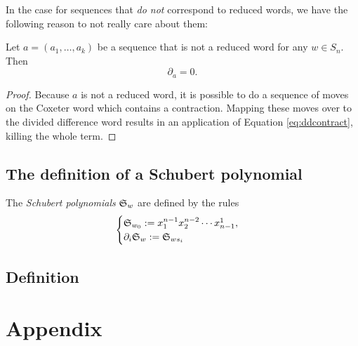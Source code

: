 \documentclass{article}
\newcommand{\frkS}{\ensuremath\mathfrak{S}}
\begin{document}
In the case for sequences that \textit{do not} correspond to reduced words, we have the following reason to not really care about them:
\begin{theorem}\label{thm:ddnonreducedzero}
    Let $a=(a_1,\ldots,a_k)$ be a sequence that is not a reduced word for any $w \in S_n$. Then
    \[
        \partial_a = 0.
    \]
\end{theorem}

\begin{proof}
    Because $a$ is not a reduced word, it is possible to do a sequence of moves on the Coxeter word which contains a contraction.
    Mapping these moves over to the divided difference word results in an application of Equation \ref{eq:ddcontract}, killing the whole term.
\end{proof}

\subsection{The definition of a Schubert polynomial}

\begin{definition}
    The \textit{Schubert polynomials} $\frkS_w$ are defined by the rules
    \[
        \begin{cases}
        \frkS_{w_0} := x_1^{n-1}x_2^{n-2}\cdots x_{n-1}^1, \\
        \partial_i\frkS_w := \frkS_{ws_i}
        \end{cases}
    \]
\end{definition}

\subsection{Definition}


\section{Appendix}
\end{document}
